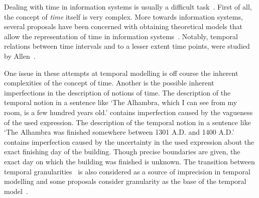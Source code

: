 Dealing with time in information systems is usually a difficult task~\cite{Bolour82}.
First of all, the concept of \emph{time} itself is very complex. More towards information systems, several proposals have been concerned with obtaining theoretical models that allow the representation of time in information systems~\cite{Cru97}. Notably, temporal relations between time intervals and to a lesser extent time points, were studied by Allen~\cite{Allen83}.


One issue in these attempts at temporal modelling is off course the inherent complexities of the concept of time. Another is the possible inherent imperfections in the description of notions of time. The description of the temporal notion in a sentence like `The Alhambra, which I can see from my room, is a few hundred years old.' contains imperfection caused by the vagueness of the used expression. The description of the temporal notion in a sentence like `The Alhambra was finished somewhere between 1301 A.D. and 1400 A.D.' contains imperfection caused by the uncertainty in the used expression about the exact finishing day of the building. Though precise boundaries are given, the exact day on which the building was finished is unknown. The transition between temporal granularities~\cite{Lin97} is also considered as a source of imprecision in temporal modelling and some proposals consider granularity as the base of the temporal model~\cite{Cru97}.


